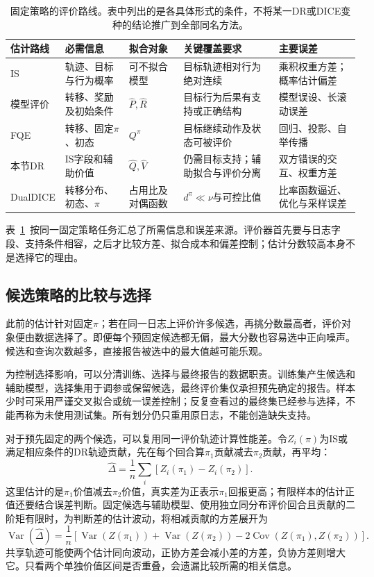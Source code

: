 \begin{table}[htbp]
  \centering
  \small
  \begin{tabularx}{\linewidth}{p{17mm}XXXX}
    \toprule
    估计路线 & 必需信息 & 拟合对象 & 关键覆盖要求 & 主要误差 \\
    \midrule
    IS & 轨迹、目标与行为概率 & 可不拟合模型 & 目标轨迹相对行为绝对连续 & 乘积权重方差；概率估计偏差 \\
    模型评价 & 转移、奖励及初始条件 & $\widehat P,\widehat R$ & 目标行为后果有支持或正确结构 & 模型误设、长滚动误差 \\
    FQE & 转移、固定$\pi$、初态 & $Q^\pi$ & 目标继续动作及状态可被评价 & 回归、投影、自举传播 \\
    本节DR & IS字段和辅助价值 & $\widehat Q,\widehat V$ & 仍需目标支持；辅助拟合与评价分离 & 双方错误的交互、权重方差 \\
    DualDICE & 转移分布、初态、$\pi$ & 占用比及对偶函数 & $d^\pi\ll\nu$与可控比值 & 比率函数逼近、优化与采样误差 \\
    \bottomrule
  \end{tabularx}
  \caption{固定策略的评价路线。表中列出的是各具体形式的条件，不将某一DR或DICE变种的结论推广到全部同名方法。}
  \label{tab:rl-information-estimators}
\end{table}

表~\ref{tab:rl-information-estimators}~按同一固定策略任务汇总了所需信息和误差来源。评价器首先要与日志字段、支持条件相容，之后才比较方差、拟合成本和偏差控制；估计分数较高本身不是选择它的理由。

\subsection{候选策略的比较与选择}
\label{sec:rl-information-selection}

此前的估计针对固定$\pi$；若在同一日志上评价许多候选，再挑分数最高者，评价对象便由数据选择了。即便每个预固定候选都无偏，最大分数也容易选中正向噪声。候选和查询次数越多，直接报告被选中的最大值越可能乐观。

为控制选择影响，可以分清训练、选择与最终报告的数据职责。训练集产生候选和辅助模型，选择集用于调参或保留候选，最终评价集仅承担预先确定的报告。样本少时可采用严谨交叉拟合或统一误差控制；反复查看过的最终集已经参与选择，不能再称为未使用测试集。所有划分仍只重用原日志，不能创造缺失支持。

对于预先固定的两个候选，可以复用同一评价轨迹计算性能差。令$Z_i(\pi)$为IS或满足相应条件的DR轨迹贡献，先在每个回合算$\pi_1$贡献减去$\pi_2$贡献，再平均：
\begin{equation}
  \label{eq:rl-information-paired}
  \widehat\Delta=\frac1n\sum_i[Z_i(\pi_1)-Z_i(\pi_2)].
\end{equation}
这里估计的是$\pi_1$价值减去$\pi_2$价值，真实差为正表示$\pi_1$回报更高；有限样本的估计正值还要结合误差判断。固定候选与辅助模型、使用独立同分布评价回合且贡献的二阶矩有限时，为判断差的估计波动，将相减贡献的方差展开为
\[
  \operatorname{Var}(\widehat\Delta)
  =\frac1n\left[
    \operatorname{Var}(Z(\pi_1))+\operatorname{Var}(Z(\pi_2))
    -2\operatorname{Cov}(Z(\pi_1),Z(\pi_2))\right].
\]
共享轨迹可能使两个估计同向波动，正协方差会减小差的方差，负协方差则增大它。只看两个单独价值区间是否重叠，会遗漏比较所需的相关信息。

